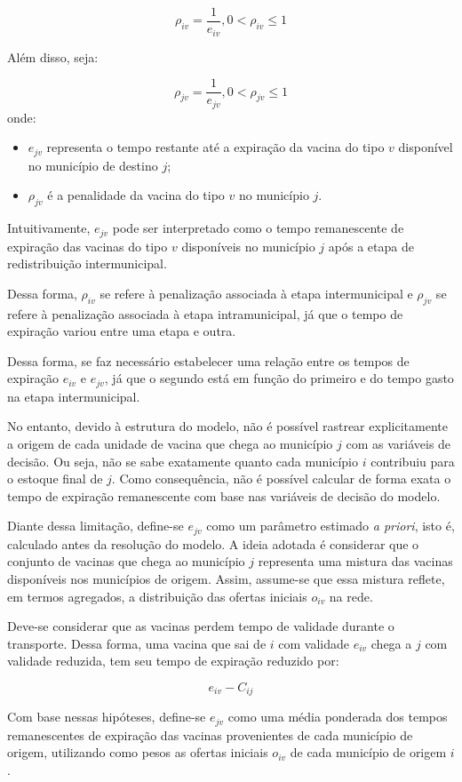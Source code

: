 \[
\rho_{iv} = \frac{1}{e_{iv}}, 0 < \rho_{iv} \le 1
\]


Além disso, seja:

\[
\rho_{jv} = \frac{1}{e_{jv}}, 0 < \rho_{jv} \le 1
\]
onde:
\begin{itemize}
\item  $e_{jv}$ representa o tempo restante até a expiração da vacina do tipo $v$ disponível no município de destino $j$;
\item $\rho_{jv}$ é a penalidade da vacina do tipo $v$ no município $j$.
\end{itemize}

Intuitivamente, $e_{jv}$ pode ser interpretado como o tempo remanescente de expiração das vacinas do tipo $v$ disponíveis no município $j$ após a etapa de redistribuição intermunicipal.

Dessa forma, $\rho_{iv}$ se refere à penalização associada à etapa intermunicipal e $\rho_{jv}$ se refere à penalização associada à etapa intramunicipal, já que o tempo de expiração variou entre uma etapa e outra.

Dessa forma, se faz necessário estabelecer uma relação entre os tempos de expiração $e_{iv}$ e $e_{jv}$, já que o segundo está em função do primeiro e do tempo gasto na etapa intermunicipal.

No entanto, devido à estrutura do modelo, não é possível rastrear explicitamente a origem de cada unidade de vacina que chega ao município $j$ com as variáveis de decisão. Ou seja, não se sabe exatamente quanto cada município $i$ contribuiu para o estoque final de $j$. Como consequência, não é possível calcular de forma exata o tempo de expiração remanescente com base nas variáveis de decisão do modelo.

Diante dessa limitação, define-se $e_{jv}$ como um parâmetro estimado \textit{a priori}, isto é, calculado antes da resolução do modelo. A ideia adotada é considerar que o conjunto de vacinas que chega ao município $j$ representa uma mistura das vacinas disponíveis nos municípios de origem. Assim, assume-se que essa mistura reflete, em termos agregados, a distribuição das ofertas iniciais $o_{iv}$ na rede.

Deve-se considerar que as vacinas perdem tempo de validade durante o transporte. Dessa forma, uma vacina que sai de $i$ com validade $e_{iv}$ chega a $j$ com validade reduzida, tem seu tempo de expiração reduzido por:

\[
e_{iv} - C_{ij}
\]

Com base nessas hipóteses, define-se $e_{jv}$ como uma média ponderada dos tempos remanescentes de expiração das vacinas provenientes de cada município de origem, utilizando como pesos as ofertas iniciais $o_{iv}$ de cada município de origem $i$. 

